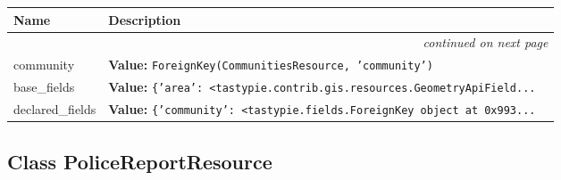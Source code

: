     \vspace{-1cm}
\hspace{\varindent}\begin{longtable}{|p{\varnamewidth}|p{\vardescrwidth}|l}
\cline{1-2}
\cline{1-2} \centering \textbf{Name} & \centering \textbf{Description}& \\
\cline{1-2}
\endhead\cline{1-2}\multicolumn{3}{r}{\small\textit{continued on next page}}\\\endfoot\cline{1-2}
\endlastfoot\raggedright c\-o\-m\-m\-u\-n\-i\-t\-y\- & \raggedright \textbf{Value:} 
{\tt ForeignKey(CommunitiesResource, 'community')}&\\
\cline{1-2}
\raggedright b\-a\-s\-e\-\_\-f\-i\-e\-l\-d\-s\- & \raggedright \textbf{Value:} 
{\tt \texttt{\{}\texttt{'}\texttt{area}\texttt{'}\texttt{: }{\textless}tastypie.contrib.gis.resources.GeometryApiField\texttt{...}}&\\
\cline{1-2}
\raggedright d\-e\-c\-l\-a\-r\-e\-d\-\_\-f\-i\-e\-l\-d\-s\- & \raggedright \textbf{Value:} 
{\tt \texttt{\{}\texttt{'}\texttt{community}\texttt{'}\texttt{: }{\textless}tastypie.fields.ForeignKey object at 0x993\texttt{...}}&\\
\cline{1-2}
\end{longtable}



\subsection{Class PoliceReportResource}

